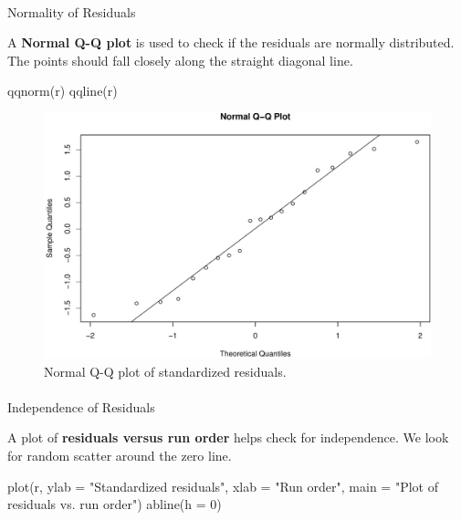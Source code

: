 \documentclass[
  letterpaper,
]{scrbook}
\makeatletter
\let\oldparagraph\paragraph
\renewcommand{\paragraph}{
    \@ifstar
      \xxxParagraphStar
      \xxxParagraphNoStar
  }
\newcommand{\xxxParagraphStar}[1]{\oldparagraph*{#1}\mbox{}}
\newcommand{\xxxParagraphNoStar}[1]{\oldparagraph{#1}\mbox{}}
\newenvironment{Shaded}{\begin{snugshade}}{\end{snugshade}}
\newcommand{\AttributeTok}[1]{\textcolor[rgb]{0.40,0.45,0.13}{#1}}
\newcommand{\DecValTok}[1]{\textcolor[rgb]{0.68,0.00,0.00}{#1}}
\newcommand{\FunctionTok}[1]{\textcolor[rgb]{0.28,0.35,0.67}{#1}}
\newcommand{\NormalTok}[1]{\textcolor[rgb]{0.00,0.23,0.31}{#1}}
\newcommand{\StringTok}[1]{\textcolor[rgb]{0.13,0.47,0.30}{#1}}
\makeatother
\begin{document}
\paragraph{Normality of Residuals}\label{normality-of-residuals}

A \textbf{Normal Q-Q plot} is used to check if the residuals are
normally distributed. The points should fall closely along the straight
diagonal line.

\begin{Shaded}
\begin{Highlighting}[]
\FunctionTok{qqnorm}\NormalTok{(r)}
\FunctionTok{qqline}\NormalTok{(r)}
\end{Highlighting}
\end{Shaded}

\begin{figure}[H]

{\centering \includegraphics{unit5-factor/crbd_files/figure-pdf/qq-plot-1.pdf}

}

\caption{Normal Q-Q plot of standardized residuals.}

\end{figure}%

\paragraph{Independence of Residuals}\label{independence-of-residuals}

A plot of \textbf{residuals versus run order} helps check for
independence. We look for random scatter around the zero line.

\begin{Shaded}
\begin{Highlighting}[]
\FunctionTok{plot}\NormalTok{(r, }\AttributeTok{ylab =} \StringTok{"Standardized residuals"}\NormalTok{, }\AttributeTok{xlab =} \StringTok{"Run order"}\NormalTok{,}
     \AttributeTok{main =} \StringTok{"Plot of residuals vs. run order"}\NormalTok{)}
\FunctionTok{abline}\NormalTok{(}\AttributeTok{h =} \DecValTok{0}\NormalTok{)}
\end{Highlighting}
\end{Shaded}
\end{document}
